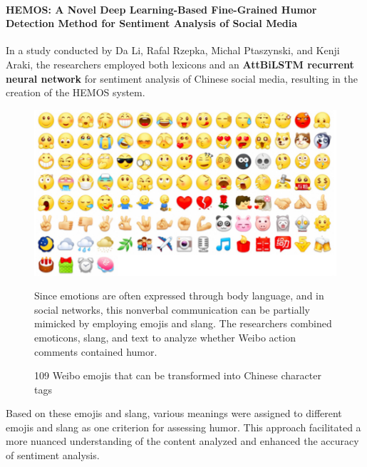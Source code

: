 \documentclass[a4paper]{article}
\begin{document}
\paragraph{HEMOS: A Novel Deep Learning-Based Fine-Grained Humor Detection Method for Sentiment Analysis of Social Media}

In a study conducted by Da Li, Rafal Rzepka, Michal Ptaszynski, and Kenji Araki, the researchers employed both lexicons and an \textbf{AttBiLSTM recurrent neural network} for sentiment analysis of Chinese social media, resulting in the creation of the HEMOS system.

\begin{figure}[H]
    \centering
    \begin{minipage}{0.48\textwidth}
        \centering
        \includegraphics[width=1\textwidth]{./images/108_Weibo_emojis.png}
        \caption{109 Weibo emojis that can be transformed into Chinese character tags}
        \label{fig.109 Weibo emojis that can be transformed into Chinese character tags.[HEMOS: A Novel Deep Learning-Based Fine-Grained Humor Detection Method for Sentiment Analysis of Social Media]}
    \end{minipage}\hfill
    \begin{minipage}{0.48\textwidth}
        Since emotions are often expressed through body language, and in social networks, this nonverbal communication can be partially mimicked by employing emojis and slang. The researchers combined emoticons, slang, and text to analyze whether Weibo action comments contained humor.
    \end{minipage}
\end{figure}

Based on these emojis and slang, various meanings were assigned to different emojis and slang as one criterion for assessing humor. This approach facilitated a more nuanced understanding of the content analyzed and enhanced the accuracy of sentiment analysis.
\end{document}
